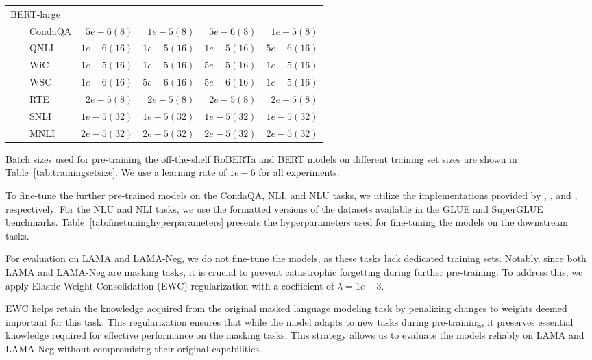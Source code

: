 \begin{table*}
\begin{tabular}{l rrrr}
\midrule
{BERT-large} & \\
~~~~CondaQA & $5e-6(8)$ & $1e-5(8)$ & $5e-6(8)$ & $1e-5(8)$ \\
~~~~QNLI & $1e-6(16)$ & $1e-5(16)$ & $1e-5(16)$ & $5e-6(16)$ \\
~~~~WiC & $1e-5(16)$ & $1e-5(16)$ & $5e-5(16)$ & $1e-5(16)$ \\
~~~~WSC & $1e-6(16)$ & $5e-6(16)$ & $5e-6(16)$ & $1e-5(16)$ \\
~~~~RTE & $2e-5(8)$ & $2e-5(8)$ & $2e-5(8)$ & $2e-5(8)$ \\
~~~~SNLI & $1e-5(32)$ & $1e-5(32)$ & $1e-5(32)$ & $1e-5(32)$ \\
~~~~MNLI & $2e-5(32)$ & $2e-5(32)$ & $2e-5(32)$ & $2e-5(32)$ \\
\bottomrule
\end{tabular}
\caption{
    The learning rates (and batch sizes) used for fine-tuning the pre-trained models on the training sets of the corpora we evaluate on.   
    \label{tab:finetuninghyperparameters} 
}
\end{table*}

Batch sizes used for pre-training the off-the-shelf {RoBERTa} and {BERT} models on different training set sizes 
are shown in Table~\ref{tab:trainingsetsize}.
We use a learning rate of $1e-6$ for all experiments.

To fine-tune the further pre-trained models on the CondaQA, NLI, and NLU tasks, we utilize the implementations 
provided by \citet{rezaei2024paraphrasing},
 \citet{hossain-etal-2020-analysis}, 
 and \citet{hossain-etal-2022-analysis}, respectively. 
For the NLU and NLI tasks, we use the formatted versions of the datasets available in the 
GLUE \cite{wang-etal-2018-glue} and SuperGLUE \cite{wang2020superglue} benchmarks.
Table~\ref{tab:finetuninghyperparameters} presents the hyperparameters used for fine-tuning the models on the downstream tasks.

For evaluation on LAMA and LAMA-Neg, we do not fine-tune the models, 
as these tasks lack dedicated training sets. 
Notably, since both LAMA and LAMA-Neg are masking tasks, 
it is crucial to prevent catastrophic forgetting during further pre-training. 
To address this, 
we apply Elastic Weight Consolidation (EWC) regularization \cite{ewcregularization} with a coefficient of $\lambda = 1e-3$. 

EWC helps retain the knowledge acquired from the original masked language modeling task 
by penalizing changes to weights deemed important for this task. 
This regularization ensures that while the model adapts to new tasks during pre-training, 
it preserves essential knowledge required for effective performance on the masking tasks. 
This strategy allows us to evaluate the models reliably on LAMA and LAMA-Neg without compromising their original capabilities.